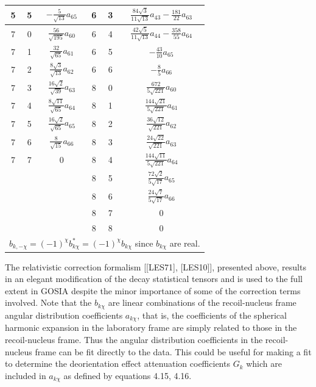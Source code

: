 \documentclass[10pt]{article}
\begin{document}
\begin{center}
\begin{tabular}{|c|c|c|c|c|c|}
\hline
5 & 5 & $-\frac{5}{\sqrt{13}} a_{65}$ & 6 & 3 & $\frac{84 \sqrt{3}}{11 \sqrt{13}} a_{43}-\frac{181}{22} a_{63}$ \\
\hline
7 & 0 & $\frac{56}{\sqrt{195}} a_{60}$ & 6 & 4 & $\frac{42 \sqrt{5}}{11 \sqrt{13}} a_{44}-\frac{358}{55} a_{64}$ \\
\hline
7 & 1 & $\frac{32}{\sqrt{65}} a_{61}$ & 6 & 5 & $-\frac{43}{10} a_{65}$ \\
\hline
7 & 2 & $\frac{8 \sqrt{3}}{\sqrt{13}} a_{62}$ & 6 & 6 & $-\frac{8}{5} a_{66}$ \\
\hline
7 & 3 & \( \frac{16 \sqrt{2}}{\sqrt{39}} a_{63} \) & 8 & 0 & $\frac{672}{5 \sqrt{221}} a_{60}$ \\
\hline
7 & 4 & $\frac{8 \sqrt{11}}{\sqrt{65}} a_{64}$ & 8 & 1 & $\frac{144 \sqrt{21}}{5 \sqrt{221}} a_{61}$ \\
\hline
7 & 5 & $\frac{16 \sqrt{2}}{\sqrt{65}} a_{65}$ & 8 & 2 & \( \frac{36 \sqrt{12}}{\sqrt{221}} a_{62} \) \\
\hline
7 & 6 & $\frac{8}{\sqrt{15}} a_{66}$ & 8 & 3 & \( \frac{24 \sqrt{22}}{\sqrt{221}} a_{63} \) \\
\hline
7 & 7 & 0 & 8 & 4 & \( \frac{144 \sqrt{11}}{5 \sqrt{221}} a_{64} \) \\
\hline
 &  &  & 8 & 5 & \( \frac{72 \sqrt{2}}{5 \sqrt{17}} a_{65} \) \\
\hline
 &  &  & 8 & 6 & \( \frac{24 \sqrt{7}}{5 \sqrt{17}} a_{66} \) \\
\hline
 &  &  & 8 & 7 & 0 \\
\hline
 &  &  & 8 & 8 & 0 \\
\hline
\multicolumn{6}{|r|}{$b_{k,-\chi}=(-1)^{\chi} b_{k \chi}^{*}=(-1)^{\chi} b_{k \chi}$ since $b_{k \chi}$ are real.} \\
\hline
\end{tabular}
\end{center}

The relativistic correction formalism [[LES71], [LES10]], presented above, results in an elegant modification of the decay statistical tensors and is used to the full extent in GOSIA despite the minor importance of some of the correction terms involved. Note that the $b_{k \chi}$ are linear combinations of the recoil-nucleus frame angular distribution coefficients $a_{k \chi}$, that is, the coefficients of the spherical harmonic expansion in the laboratory frame are simply related to those in the recoil-nucleus frame. Thus the angular distribution coefficients in the recoil-nucleus frame can be fit directly to the data. This could be useful for making a fit\\
to determine the deorientation effect attenuation coefficients $G_{k}$ which are included in $a_{k \chi}$ as defined by equations 4.15, 4.16.
\end{document}
